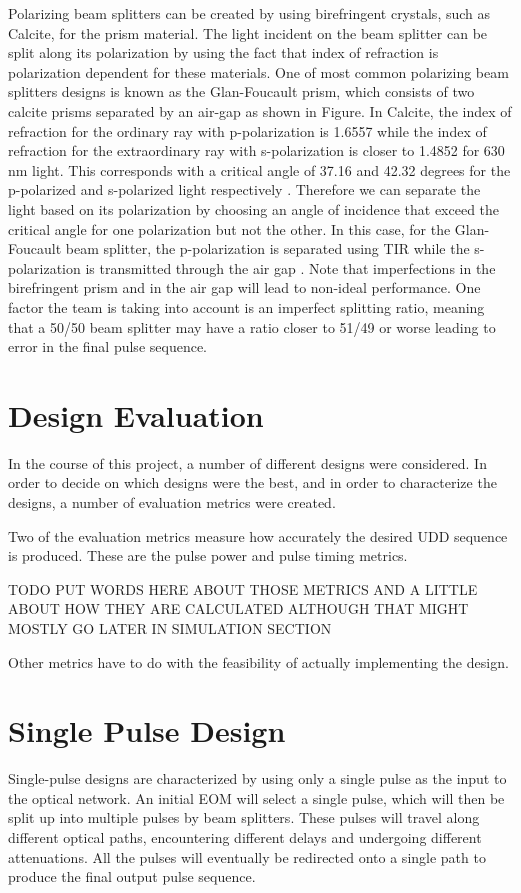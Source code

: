\documentclass[pdftex,12pt,a4paper]{article}
\begin{document}
Polarizing beam splitters can be created by using birefringent crystals, such as Calcite, for the prism material. The light incident on the beam splitter can be split along its polarization by using the fact that index of refraction is polarization dependent for these materials. One of most common polarizing beam splitters designs is known as the Glan-Foucault prism, which consists of two calcite prisms separated by an air-gap as shown in Figure. In Calcite, the index of refraction for the ordinary ray with p-polarization is 1.6557 while the index of refraction for the extraordinary ray with s-polarization is closer to 1.4852 for 630 nm light. This corresponds with a critical angle of 37.16 and 42.32 degrees for the p-polarized and s-polarized light respectively \cite{Properties_of_Prisms}. Therefore we can separate the light based on its polarization by choosing an angle of incidence that exceed the critical angle for one polarization but not the other. In this case, for the Glan-Foucault beam splitter, the p-polarization is separated using TIR while the s-polarization is transmitted through the air gap \cite{Properties_of_Prisms}. Note that imperfections in the birefringent prism and in the air gap will lead to non-ideal performance. One factor the team is taking into account is an imperfect splitting ratio, meaning that a 50/50 beam splitter may have a ratio closer to 51/49 or worse leading to error in the final pulse sequence.


\section{Design Evaluation}
\label{sec:design_evaluation}
In the course of this project, a number of different designs were considered. In order to decide on which designs were the best, and in order to characterize the designs, a number of evaluation metrics were created.

Two of the evaluation metrics measure how accurately the desired UDD sequence is produced. These are the pulse power and pulse timing metrics.

TODO PUT WORDS HERE ABOUT THOSE METRICS AND A LITTLE ABOUT HOW THEY ARE CALCULATED ALTHOUGH THAT MIGHT MOSTLY GO LATER IN SIMULATION SECTION

Other metrics have to do with the feasibility of actually implementing the design.



\section{Single Pulse Design}
\label{sec:single_pulse_design}
Single-pulse designs are characterized by using only a single pulse as the input to the optical network. An initial EOM will select a single pulse, which will then be split up into multiple pulses by beam splitters. These pulses will travel along different optical paths, encountering different delays and undergoing different attenuations. All the pulses will eventually be redirected onto a single path to produce the final output pulse sequence. 
\end{document}
